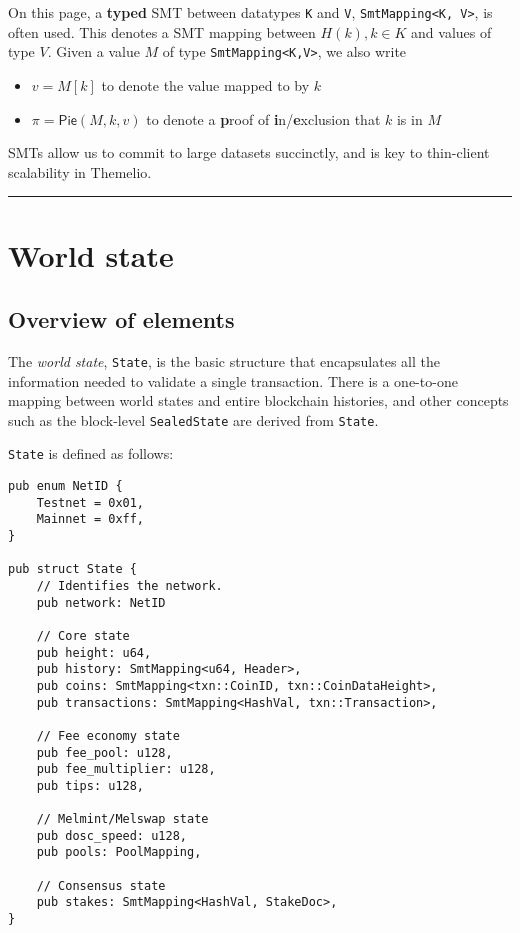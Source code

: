 \documentclass[
]{article}
\newcommand{\passthrough}[1]{#1}
\providecommand{\tightlist}{%
  \setlength{\itemsep}{0pt}\setlength{\parskip}{0pt}}
\begin{document}
On this page, a \textbf{typed} SMT between datatypes
\passthrough{\lstinline!K!} and \passthrough{\lstinline!V!},
\passthrough{\lstinline!SmtMapping<K, V>!}, is often used. This denotes
a SMT mapping between \(H(k), k \in K\) and values of type \(V\). Given
a value \(M\) of type \passthrough{\lstinline!SmtMapping<K,V>!}, we also
write

\begin{itemize}
  \tightlist
  \item
        \(v=M[k]\) to denote the value mapped to by \(k\)
  \item
        \(\pi=\mathsf{Pie}(M, k, v)\) to denote a \textbf{p}roof of
        \textbf{i}n/\textbf{e}xclusion that \(k\) is in \(M\)
\end{itemize}

SMTs allow us to commit to large datasets succinctly, and is key to
thin-client scalability in Themelio.

\begin{center}\rule{0.5\linewidth}{0.5pt}\end{center}

\hypertarget{world-state}{%
  \section{World state}\label{world-state}}

\hypertarget{overview-of-elements}{%
  \subsection{Overview of elements}\label{overview-of-elements}}

The \emph{world state}, \passthrough{\lstinline!State!}, is the basic
structure that encapsulates all the information needed to validate a
single transaction. There is a one-to-one mapping between world states
and entire blockchain histories, and other concepts such as the
block-level \passthrough{\lstinline!SealedState!} are derived from
\passthrough{\lstinline!State!}.

\passthrough{\lstinline!State!} is defined as follows:

\begin{lstlisting}
pub enum NetID {
    Testnet = 0x01,
    Mainnet = 0xff,
}

pub struct State {
    // Identifies the network.
    pub network: NetID

    // Core state
    pub height: u64,
    pub history: SmtMapping<u64, Header>,
    pub coins: SmtMapping<txn::CoinID, txn::CoinDataHeight>,
    pub transactions: SmtMapping<HashVal, txn::Transaction>,

    // Fee economy state
    pub fee_pool: u128,
    pub fee_multiplier: u128,
    pub tips: u128,

    // Melmint/Melswap state
    pub dosc_speed: u128,
    pub pools: PoolMapping,

    // Consensus state
    pub stakes: SmtMapping<HashVal, StakeDoc>,
}
\end{lstlisting}
\end{document}
